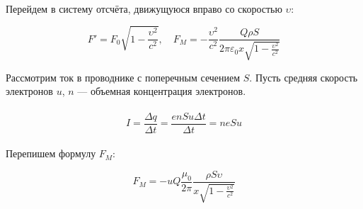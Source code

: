 \documentclass{article}
\begin{document}
\paragraph{}

Перейдем в систему отсчёта, движущуюся вправо со скоростью $\upsilon$:

\begin{equation*}
  F' = F_0\sqrt{1-\frac{\upsilon^2}{c^2}}, \quad F_M = -\frac{\upsilon^2}{c^2}\frac{Q\rho S}
  {2\pi\varepsilon_0x\sqrt{1-\frac{\upsilon^2}{c^2}}}
\end{equation*}

\newpage

Рассмотрим ток в проводнике с поперечным сечением $S$. Пусть средняя скорость электронов $u$,
$n$ --- объемная концентрация электронов.

\paragraph{}
\noindent{}
\paragraph{}

\begin{equation*}
  I = \frac{\Delta q}{\Delta t} = \frac{enSu\Delta t}{\Delta t} = neSu
\end{equation*}
\paragraph{}

Перепишем формулу $F_M$:

\begin{equation*}
  F_M = -uQ\frac{\mu_0}{2\pi}\frac{\rho S\upsilon}{x\sqrt{1-\frac{\upsilon^2}{c^2}}}
\end{equation*}
\paragraph{}
\end{document}
